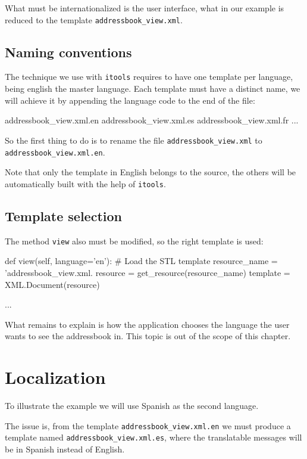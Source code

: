 What must be internationalized is the user interface, what in our example
is reduced to the template {\tt addressbook\_view.xml}.

\subsection{Naming conventions}

The technique we use with {\tt itools} requires to have one template per
language, being english the master language. Each template must have a
distinct name, we will achieve it by appending the language code to the
end of the file:

\begin{code}
    addressbook_view.xml.en
    addressbook_view.xml.es
    addressbook_view.xml.fr
    ...
\end{code}

So the first thing to do is to rename the file {\tt addressbook\_view.xml}
to {\tt addressbook\_view.xml.en}.

Note that only the template in English belongs to the source, the others
will be automatically built with the help of {\tt itools}.

\subsection{Template selection}

The method {\tt view} also must be modified, so the right template is used:

\begin{code}
    def view(self, language='en'):
        # Load the STL template
        resource_name = 'addressbook_view.xml.%
        resource = get_resource(resource_name)
        template = XML.Document(resource)

        ...
\end{code}


What remains to explain is how the application chooses the language the
user wants to see the addressbook in. This topic is out of the scope
of this chapter.

\section{Localization}

To illustrate the example we will use Spanish as the second language.

The issue is, from the template {\tt addressbook\_view.xml.en} we
must produce a template named {\tt addressbook\_view.xml.es}, where
the translatable messages will be in Spanish instead of English.


